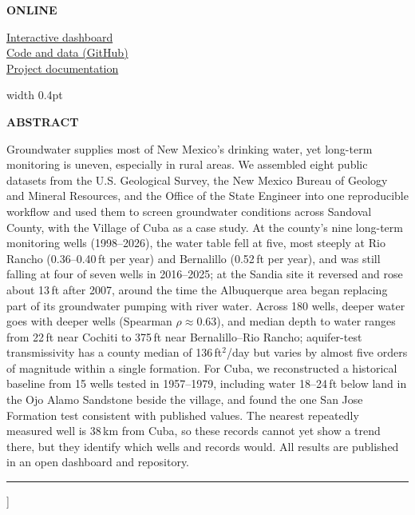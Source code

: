 \documentclass[10pt,twocolumn,letterpaper]{article}
\newcommand{\infohead}[1]{{\color{titleblue}\footnotesize\bfseries\MakeUppercase{#1}}\par\vspace{2pt}}
\begin{document}
{\begin{minipage}[t]{0.25\textwidth}
  \infohead{Online}
  \href{https://eng220aquiferproject.streamlit.app/}{Interactive dashboard}\\
  \href{https://github.com/pdjordj11/eng_220_aquifer_project}{Code and data (GitHub)}\\
  \href{https://pdjordj11.github.io/eng_220_aquifer_project/}{Project documentation}
\end{minipage}%
\hfill{\color{accentblue}\vrule width 0.4pt}\hfill
\begin{minipage}[t]{0.70\textwidth}
  \infohead{Abstract}
  \small
  Groundwater supplies most of New Mexico's drinking water, yet long-term monitoring is uneven,
  especially in rural areas. We assembled eight public datasets from the U.S. Geological Survey, the
  New Mexico Bureau of Geology and Mineral Resources, and the Office of the State Engineer into one
  reproducible workflow and used them to screen groundwater conditions across Sandoval County, with
  the Village of Cuba as a case study. At the county's nine long-term monitoring wells (1998--2026),
  the water table fell at five, most steeply at Rio Rancho (0.36--0.40\,ft per year) and Bernalillo
  (0.52\,ft per year), and was still falling at four of seven wells in 2016--2025; at the Sandia site
  it reversed and rose about 13\,ft after 2007, around the time the Albuquerque area began replacing
  part of its groundwater pumping with river water. Across 180 wells, deeper water goes with deeper wells
  (Spearman $\rho\approx0.63$), and median depth to water ranges from 22\,ft near Cochiti to 375\,ft near
  Bernalillo--Rio Rancho; aquifer-test transmissivity has a county median of 136\,ft$^2$/day but varies
  by almost five orders of magnitude within a single formation. For Cuba, we reconstructed a historical baseline from 15 wells tested in
  1957--1979, including water 18--24\,ft below land in the Ojo Alamo Sandstone beside the village,
  and found the one San Jose Formation test consistent with published values. The nearest
  repeatedly measured well is 38\,km from Cuba, so these records cannot yet show a trend there, but
  they identify which wells and records would. All results are published in an open dashboard and
  repository.
\end{minipage}
\par\vspace{1.6ex}
{\color{accentblue}\rule{\textwidth}{0.4pt}}\par\vspace{2.6ex}
}]
\thispagestyle{firstpage}

\end{document}

